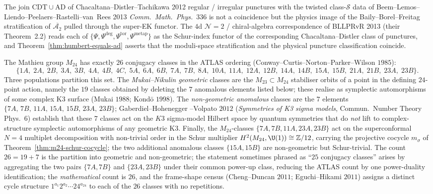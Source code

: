 The join $\mathrm{CDT}\cup\mathrm{AD}$ of
Chacaltana--Distler--Tachikawa 2012 regular / irregular
punctures with the twisted class-$\mathcal S$ data of
Beem--Lemos--Liendo--Peelaers--Rastelli--van~Rees 2013
\textit{Comm.~Math.~Phys.}~336 is not a coincidence but the
physics image of the Baily--Borel--Freitag stratification of
$\overline{\mathcal A_2}$ pulled through the super-EK functor.
The $4$d $\mathcal N = 2$ / chiral-algebra correspondence of
BLLPRvR 2013 (their Theorem~2.2) reads each of
$\{\Psi, \Psi^{\deg}, \Psi^{\mathrm{tor}},
\Psi^{\mathrm{metap}}\}$ as the Schur-index functor of the
corresponding Chacaltana--Distler class of punctures, and
Theorem~\ref{thm:humbert-equals-ad} asserts that the
moduli-space stratification and the physical puncture
classification coincide.

\begin{remark}
\label{rem:mathieu-conjugacy-geometric-anomalous}
The Mathieu group $M_{24}$ has exactly $26$ conjugacy classes in
the ATLAS ordering \textup{(}Conway--Curtis--Norton--Parker--Wilson
$1985$\textup{)}:
\[
\{1A,\;2A,\;2B,\;3A,\;3B,\;4A,\;4B,\;4C,\;5A,\;6A,\;6B,\;7A,\;7B,\;
8A,\;10A,\;11A,\;12A,\;12B,\;14A,\;14B,\;15A,\;15B,\;21A,\;21B,\;23A,\;23B\}.
\]
Three populations partition this set. The \emph{Mukai--Nikulin
geometric} classes are the $M_{23}\subset M_{24}$ stabiliser
orbits of a point in the defining $24$-point action, namely the
$19$ classes obtained by deleting the $7$ anomalous elements listed
below; these realise as symplectic automorphisms of some complex
K3 surface \textup{(}Mukai $1988$; Kond\=o $1998$\textup{)}. The
\emph{non-geometric anomalous} classes are the $7$ elements
$\{7A,\,7B,\,11A,\,15A,\,15B,\,23A,\,23B\}$; Gaberdiel--Hohenegger
--Volpato $2012$ \textup{(}\emph{Symmetries of K3 sigma models},
Commun.~Number Theory Phys.~$6$\textup{)} establish that these
$7$ classes act on the $K3$ sigma-model Hilbert space by quantum
symmetries that do \emph{not} lift to complex-structure symplectic
automorphisms of any geometric K3. Finally, the $M_{24}$-classes
$\{7A,7B,11A,23A,23B\}$ act on the superconformal $N = 4$
multiplet decomposition with non-trivial order in the Schur
multiplier $H^2(M_{24},\U(1))\cong\mathbb{Z}/12$, carrying the
projective cocycle $m_\sigma$ of Theorem~\ref{thm:m24-schur-cocycle};
the two additional anomalous classes $\{15A, 15B\}$ are non-geometric
but Schur-trivial. The count $26 = 19 + 7$ is the partition into
geometric and non-geometric; the statement sometimes phrased as
``$25$ conjugacy classes'' arises by aggregating the two pairs
$\{7A,7B\}$ and $\{23A,23B\}$ under their common power-up class,
reducing the ATLAS count by one power-duality identification; the
\emph{mathematical} count is $26$, and the frame-shape census
\textup{(}Cheng--Duncan $2011$; Eguchi--Hikami $2011$\textup{)}
assigns a distinct cycle structure $1^{a_1}2^{a_2}\cdots 24^{a_{24}}$
to each of the $26$ classes with no repetitions.
\end{remark}

